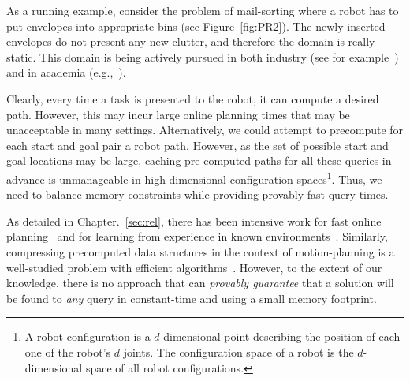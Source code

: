 \documentclass[a4paper]{report}
\begin{document}
As a running example, consider the problem of mail-sorting where a robot has to put envelopes into appropriate bins (see Figure~\ref{fig:PR2}). The newly inserted envelopes do not present any new clutter, and therefore the domain is really static. This domain is being actively pursued in both industry (see for example~\cite{DBot}) and in academia (e.g.,~\cite{hwang2015lazy}).



Clearly, every time a task is presented to the robot, it can compute a desired path.
However, this may incur large online planning times that may be unacceptable in many settings.
%
Alternatively, we could attempt to precompute for each start and goal pair a robot path.
However, as the set of possible start and goal locations may be large, caching pre-computed paths for all these queries in advance is unmanageable in high-dimensional configuration spaces\footnote{
A robot configuration is a $d$-dimensional point describing the position of each one of the robot's $d$ joints.
The configuration space of a robot is the $d$-dimensional space of all robot configurations.}.
Thus, we need to balance memory constraints while providing provably fast query times.

As detailed in Chapter.~\ref{sec:rel}, there has been intensive work 
for fast online planning~\cite{LA18} and 
for learning from experience in known environments~\cite{PCCL12,PDCL13,berenson2012robot,CSMOC15}.
Similarly, compressing precomputed data structures in the context of motion-planning is a well-studied problem with efficient algorithms~\cite{SSAH14,DB14}.
However, to the extent of our knowledge, there is no approach that can \emph{provably guarantee} that a solution will be found to \emph{any} query in constant-time and using a small memory footprint.

\end{document}
